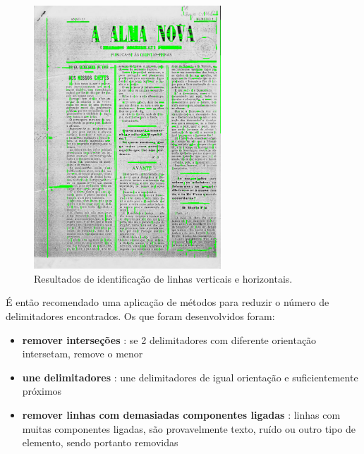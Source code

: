 \begin{figure}[H]
	\centering
	\includegraphics[width=7cm]{images/ilustracoes/get_delimiters_all_lines_example.png}
	\caption{Resultados de identificação de linhas verticais e horizontais.}
	\label{fig:get_delimiters_all_lines_example}
\end{figure}



É então recomendado uma aplicação de métodos para reduzir o número de delimitadores encontrados.
Os que foram desenvolvidos foram:

\begin{itemize}\setlength\itemsep{-0.3em}
	\item \textbf{remover interseções} : se 2 delimitadores com diferente orientação intersetam, remove o menor
	\item \textbf{une delimitadores} : une delimitadores de igual orientação e suficientemente próximos
	\item \textbf{remover linhas com demasiadas componentes ligadas} : linhas com muitas componentes ligadas, são provavelmente texto, ruído ou outro tipo de elemento, sendo portanto removidas
\end{itemize}

